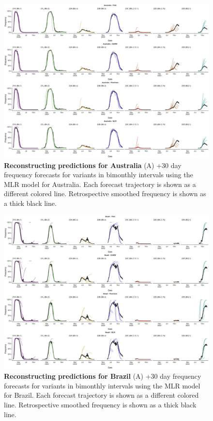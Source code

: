 \begin{figure}[th!]
	\centering
	\includegraphics[width=0.9\textwidth=0.01]{supp_figures/supplementary_fig_Australia.png}
	\caption{
		\textbf{Reconstructing predictions for Australia}
		(A) +30 day frequency forecasts for variants in bimonthly intervals using the MLR model for Australia.
		Each forecast trajectory is shown as a different colored line.
		Retrospective smoothed frequency is shown as a thick black line.
	}
	\label{fig:S2}
\end{figure}



\begin{figure}[th!]
	\centering
	\includegraphics[width=0.9\textwidth=0.01]{supp_figures/supplementary_fig_Brazil.png}
	\caption{
		\textbf{Reconstructing predictions for Brazil}
		(A) +30 day frequency forecasts for variants in bimonthly intervals using the MLR model for Brazil.
		Each forecast trajectory is shown as a different colored line.
		Retrospective smoothed frequency is shown as a thick black line.
	}
	\label{fig:S3}
\end{figure}

